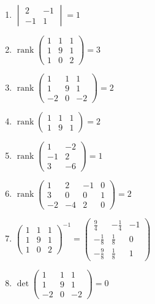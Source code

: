 \documentclass[11pt,a4paper]{article}
\begin{document}
\begin{enumerate}
\item $\displaystyle \begin{vmatrix} 2 & -1 \\ -1 & 1 \end{vmatrix} = 1$
\item $\displaystyle \operatorname{rank} \begin{pmatrix} 1 & 1 & 1 \\ 1 & 9 & 1 \\ 1 & 0 & 2 \end{pmatrix} = 3$
\item $\displaystyle \operatorname{rank} \begin{pmatrix} 1 & 1 & 1 \\ 1 & 9 & 1 \\ -2 & 0 & -2 \end{pmatrix} = 2$
\item $\displaystyle \operatorname{rank} \begin{pmatrix} 1 & 1 & 1 \\ 1 & 9 & 1 \end{pmatrix} = 2$
\item $\displaystyle \operatorname{rank} \begin{pmatrix} 1 & -2 \\ -1 & 2 \\ 3 & -6 \end{pmatrix} = 1$
\item $\displaystyle \operatorname{rank} \begin{pmatrix} 1 & 2 & -1 & 0 \\ 3 & 0 & 0 & 1 \\ -2 & -4 & 2 & 0 \end{pmatrix} = 2$
\item $\displaystyle \begin{pmatrix} 1 & 1 & 1 \\ 1 & 9 & 1 \\ 1 & 0 & 2 \end{pmatrix}^{-1} = \begin{pmatrix} \frac{9}{4} & -\frac{1}{4} & -1 \\ -\frac{1}{8} & \frac{1}{8} & 0 \\ -\frac{9}{8} & \frac{1}{8} & 1 \end{pmatrix}$
\item $\displaystyle \det \begin{pmatrix} 1 & 1 & 1 \\ 1 & 9 & 1 \\ -2 & 0 & -2 \end{pmatrix} = 0$

\end{enumerate}
\end{document}
